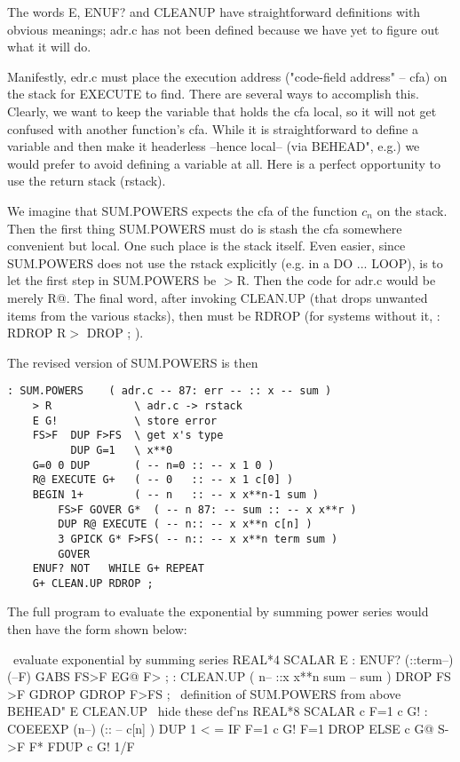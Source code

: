 The words E, ENUF? and CLEANUP have straightforward definitions with obvious meanings; adr.c has not been defined because we have yet to figure out what it will do.

Manifestly, edr.c must place the execution address ("code-field address" -- cfa) on the stack for EXECUTE to find. There are several ways to accomplish this. Clearly, we want to keep the variable that holds the cfa local, so it will not get confused with another function's cfa. While it is straightforward to define a variable and then make it headerless --hence local-- (via BEHEAD", e.g.) we would prefer to avoid defining a variable at all. Here is a perfect opportunity to use the return stack (rstack).

We imagine that SUM.POWERS expects the cfa of the function $c_n$ on the stack. Then the first thing SUM.POWERS must do is stash the cfa somewhere convenient but local. One such place is the stack itself. Even easier, since SUM.POWERS does not use the rstack explicitly (e.g. in a DO ... LOOP), is to let the first step in SUM.POWERS be $>$R. Then the code for adr.c would be merely R@. The final word, after invoking CLEAN.UP (that drops unwanted items from the various stacks), then must be RDROP (for systems without it, : RDROP R$>$ DROP ; ).

The revised version of SUM.POWERS is then
\begin{lstlisting}
: SUM.POWERS    ( adr.c -- 87: err -- :: x -- sum )
    > R             \ adr.c -> rstack
    E G!            \ store error
    FS>F  DUP F>FS  \ get x's type
          DUP G=1   \ x**0
    G=0 0 DUP       ( -- n=0 :: -- x 1 0 )
    R@ EXECUTE G+   ( -- 0   :: -- x 1 c[0] )
    BEGIN 1+        ( -- n   :: -- x x**n-1 sum )
        FS>F GOVER G*  ( -- n 87: -- sum :: -- x x**r )
        DUP R@ EXECUTE ( -- n:: -- x x**n c[n] )
        3 GPICK G* F>FS( -- n:: -- x x**n term sum )
        GOVER
    ENUF? NOT   WHILE G+ REPEAT
    G+ CLEAN.UP RDROP ;
\end{lstlisting}

The full program to evaluate the exponential by summing power series would then have the form shown below:

\ evaluate exponential by summing series
REAL*4 SCALAR E
: ENUF? (::term--) (--F)
    GABS FS>F EG@ F> ;
: CLEAN.UP ( n-- ::x x**n sum -- sum )
    DROP FS >F
    GDROP GDROP F>FS ;
\ definition of SUM.POWERS from above
BEHEAD" E CLEAN.UP \ hide these def'ns
REAL*8 SCALAR c F=1 c G!
: COEEEXP (n--) (:: -- c[n] )
    DUP 1 < =
    IF F=1 c G! F=1 DROP
    ELSE c G@ S->F
        F* FDUP c G! 1/F

